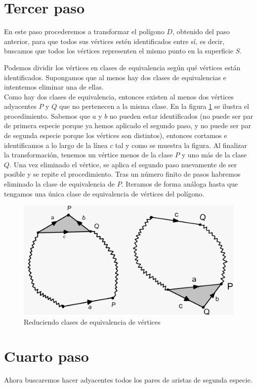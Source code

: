 \documentclass[a4paper,11pt,spanish, twoside, leqno]{tfg-uam}
\theoremstyle{definition}
\begin{document}
\section{Tercer paso}

En este paso procederemos a transformar el polígono $D$, obtenido del paso anterior, para que todos sus vértices estén identificados entre sí, es decir, buscamos que todos los vértices representen el mismo punto en la superficie $S$. 

Podemos dividir los vértices en clases de equivalencia según qué vértices están identificados. Supongamos que al menos hay dos clases de equivalencias e intentemos eliminar una de ellas.\\
Como hay dos clases de equivalencia, entonces existen al menos dos vértices adyacentes $P$ y $Q$ que no pertenecen a la misma clase. En la figura \ref{fig:paso3} se ilustra el procedimiento. Sabemos que $a$ y $b$ no pueden estar identificados (no puede ser par de primera especie porque ya hemos aplicado el segundo paso, y no puede ser par de segunda especie porque los vértices son distintos), entonces cortamos e identificamos a lo largo de la línea $c$ tal y como  se muestra la figura. Al finalizar la transformación, tenemos un vértice menos de la clase $P$ y uno más de la clase $Q$. Una vez eliminado el vértice, se aplica el segundo paso nuevamente de ser posible y se repite el procedimiento. Tras un número finito de pasos habremos eliminado la clase de equivalencia de $P$. Iteramos de forma análoga hasta que tengamos una única clase de equivalencia de vértices del polígono.

\begin{figure}[h!]
	\centering
	\includegraphics[width=0.4\linewidth]{imagenes/paso3.jpeg}
	\caption{Reduciendo clases de equivalencia de vértices}
	\label{fig:paso3}
\end{figure}


\section{Cuarto paso}

Ahora buscaremos hacer adyacentes todos los pares de aristas de segunda especie.
\end{document}
